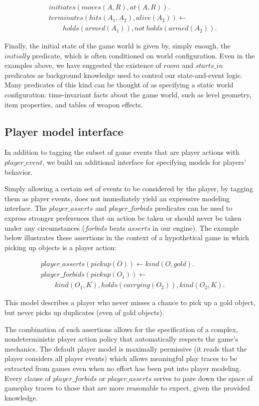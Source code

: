 \documentclass[letterpaper]{article}
\newcommand{\snippet}[1]{{\vspace{-0.4cm}\footnotesize\begin{align*}#1\end{align*}\vspace{-0.4cm}}}
\newcommand{\logical}[1]{$#1$}
\begin{document}
\snippet{&initiates(moves(A,R), at(A,R)).\\
&terminates(hits(A_1,A_2), alive(A_2)) \leftarrow\\&\qquad holds(armed(A_1)), not\ holds(armed(A_2)).}

Finally, the initial state of the game world is given by, simply enough, the
\logical{initially} predicate, which is often conditioned on world
configuration. Even in the examples above, we have suggested the existence of
\logical{room} and \logical{starts\_in} predicates as background knowledge
used to control our state-and-event logic. Many predicates of this kind can be
thought of as specifying a static world configuration: time-invariant facts
about the game world, such as level geometry, item properties, and tables of
weapon effects.

\subsection{Player model interface}

In addition to tagging the subset of game events that are player actions with
\logical{player\_event}, we build an additional interface for specifying models
for players' behavior.

Simply allowing a certain set of events to be considered by the player,
by tagging them as player events, does not immediately yield an expressive
modeling interface. The \logical{player\_asserts} and \logical{player\_forbids}
predicates can be used to express stronger preferences that an action be taken
or should never be taken under any circumstances (\logical{forbids} beats
\logical{asserts} in our engine). The example below illustrates these assertions
in the context of a hypothetical game in which picking up objects is a player
action:

\snippet{&player\_asserts(pickup(O)) \leftarrow kind(O,gold).\\
&player\_forbids(pickup(O_1)) \leftarrow\\&\qquad kind(O_1,K), holds(carrying(O_2)), kind(O_2,K).}

This model describes a player who never misses a chance to pick up a gold
object, but never picks up duplicates (even of gold objects).

The combination of such assertions allows for the specification of a complex,
nondeterministic player action policy that automatically respects the game's
mechanics. The default player model is maximally permissive (it reads that the
player considers all player events) which allows meaningful play traces to be
extracted from games even when no effort has been put into player modeling.
Every clause of \logical{player\_forbids} or \logical{player\_asserts} serves to
pare down the space of gameplay traces to those that are more reasonable to expect,
given the provided knowledge.
\end{document}
